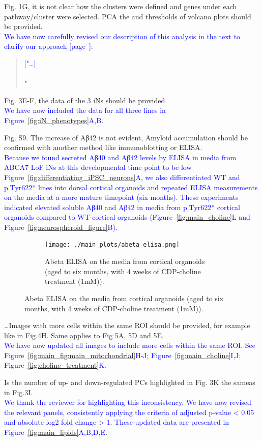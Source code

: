 \documentclass[12pt]{article}
\begin{document}
Fig. 1G, it is not clear how the clusters were defined and genes under each pathway/cluster were selected. PCA the and thresholds of volcano plots should be provided.\\
\textcolor{blue}{We have now carefully revised our description of this analysis in the text to clarify our approach [page~\pageref{quoteF-label}]:}
\begin{quote}
	\textcolor{blue}{["\dots]} \quoteF\\\\
	\quoteG\textcolor{blue}{"}
\end{quote}

Fig. 3E-F, the data of the 3 iNs should be provided.\\
\textcolor{blue}{We have now included the data for all three lines in Figure~\ref{fig:iN_phenotypes}A,B}.

Fig. S9. The increase of Aβ42 is not evident, Amyloid accumulation should be confirmed with another method like immunoblotting or ELISA.\\
\textcolor{blue}{Because we found secreted Aβ40 and Aβ42 levels by ELISA in media from ABCA7 LoF iNs at this developmental time point to be low Figure~\ref{fig:differentiating_iPSC_neurons}A, we also differentiated WT and p.Tyr622* lines into dorsal cortical organoids and repeated ELISA measurements on the media at a more mature timepoint (six months). These experiments indicated elevated soluble Aβ40 and Aβ42 in media from p.Tyr622* cortical organoids compared to WT cortical organoids (Figure~\ref{fig:main_choline}L and Figure~\ref{fig:neurospheroid_figure}B)}.
\begin{figure}[H] 
	\centering
	\begin{subfigure}[t]{.6\textwidth}
		\caption{Abeta ELISA on the media from cortical organoids (aged to six months, with 4 weeks of CDP-choline treatment (1mM)).}
		\texttt{[image: ./main\_plots/abeta\_elisa.png]}        
	\end{subfigure}  
\end{figure}

\dots Images with more cells within the same ROI should be provided, for example like in Fig.4H. Same applies to Fig 5A, 5D and 5E.\\
\textcolor{blue}{We have now updated all images to include more cells within the same ROI. See Figure~\ref{fig:main_fig:main_mitochondrial}H-J; Figure~\ref{fig:main_choline}I,J; Figure~\ref{fig:choline_treatment}K.}

Is the number of up- and down-regulated PCs highlighted in Fig. 3K the sameas in Fig.3I.\\
\textcolor{blue}{We thank the reviewer for highlighting this inconsistency. We have now revised the relevant panels, consistently applying the criteria of adjusted p-value < 0.05 and absolute log2 fold change > 1. These updated data are presented in Figure~\ref{fig:main_lipids}A,B,D,E}.
\end{document}
